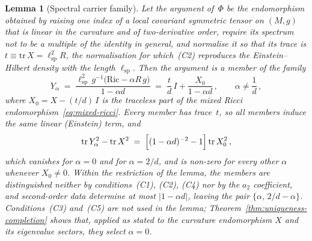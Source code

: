 \documentclass[pdflatex,sn-mathphys-num]{sn-jnl} %
\theoremstyle{remark}
\theoremstyle{plain}
\newtheorem{lemma}{Lemma}
\begin{document}
    \begin{lemma}[Spectral carrier family]
      \label{lem:spectralcarrier}
      Let the argument of~$\Phi$ be the endomorphism obtained by raising one index of a local covariant symmetric
      tensor on $(M, g)$ that is linear in the curvature and of two-derivative order, require its spectrum not to be
      a multiple of the identity in general, and normalise it so that its trace is
      $t \equiv \mathrm{tr}\,X = \ell_{\mathrm{sp}}^{2} R$, the normalisation for which~(C2) reproduces the
      Einstein--Hilbert density with the length $\ell_{\mathrm{sp}}$.
      Then the argument is a member of the family
      \begin{equation}\label{eq:carrier-family}
        Y_\alpha
        \;=\;
        \frac{\ell_{\mathrm{sp}}^{2}\, g^{-1}\bigl(\mathrm{Ric} - \alpha R\, g\bigr)}{1 - \alpha d}
        \;=\;
        \frac{t}{d}\, I + \frac{X_0}{1 - \alpha d}\,,
        \qquad
        \alpha \neq \frac{1}{d}\,,
      \end{equation}
      where $X_0 = X - (t/d)\,I$ is the traceless part of the mixed Ricci endomorphism~\eqref{eq:mixed-ricci}.
      Every member has trace~$t$, so all members induce the same linear (Einstein) term, and
      \begin{equation}\label{eq:carrier-second-order}
        \mathrm{tr}\, Y_\alpha^{2} - \mathrm{tr}\, X^{2}
        \;=\;
        \Bigl[(1 - \alpha d)^{-2} - 1\Bigr]\, \mathrm{tr}\, X_0^{2}\,,
      \end{equation}
      which vanishes for $\alpha = 0$ and for $\alpha = 2/d$, and is non-zero for every other $\alpha$ whenever
      $X_0 \neq 0$.
      Within the restriction of the lemma, the members are distinguished neither by
      conditions~\textup{(C1)}, \textup{(C2)}, \textup{(C4)} nor by the $a_2$ coefficient, and second-order data
      determine at most $|1 - \alpha d|$, leaving the pair $\{\alpha,\, 2/d - \alpha\}$.
      Conditions~\textup{(C3)} and~\textup{(C5)} are not used in the lemma; Theorem~\ref{thm:uniqueness-completion}
      shows that, applied as stated to the curvature endomorphism $X$ and its eigenvalue sectors, they select
      $\alpha = 0$.
    \end{lemma}
\end{document}
